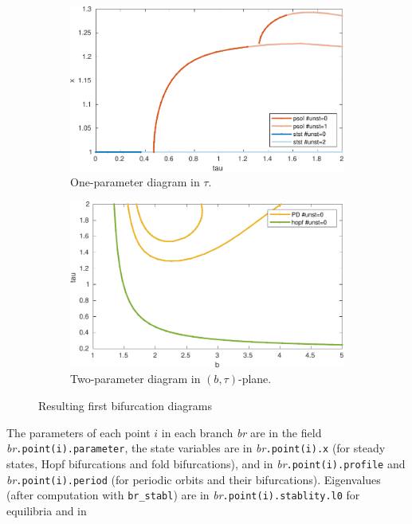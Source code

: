 \documentclass[10pt]{scrartcl}
\newcommand{\blist}[1]{\mbox{\lstinline!#1!}}
\begin{document}
\begin{figure}[t]
  \centering
  \begin{subfigure}{0.48\textwidth}
    \centering
    \includegraphics[width=0.95\linewidth]{fig/MG1d.pdf}
    \caption{One-parameter diagram in $\tau$.}
  \end{subfigure}%
  \begin{subfigure}{0.48\textwidth}
    \centering
    \includegraphics[width=0.95\linewidth]{fig/MG2d.pdf}
    \caption{Two-parameter diagram in $(b,\tau)$-plane.}
  \end{subfigure}
  \caption{Resulting first bifurcation diagrams}
  \label{fig:MGbifs}
\end{figure}The parameters of each point $i$ in each branch \emph{br}
are in the field \emph{br}\blist{.point(i).parameter}, the state
variables are in \emph{br}\blist{.point(i).x} (for steady states, Hopf
bifurcations and fold bifurcations), and in
\emph{br}\blist{.point(i).profile} and
\emph{br}\blist{.point(i).period} (for periodic orbits and their
bifurcations). Eigenvalues (after computation with \blist{br_stabl})
are in \emph{br}\blist{.point(i).stablity.l0} for equilibria and in
\end{document}
